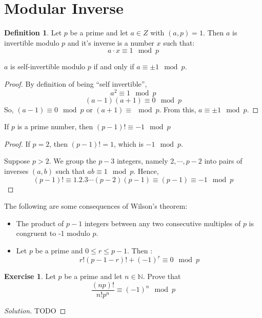 \documentclass[12pt,letterpaper]{amsbook}
\theoremstyle{definition}
\newtheorem{definition}{Definition} %
\newtheorem*{exercise}{Exercise}
\newenvironment{solution}
  {\renewcommand\qedsymbol{$\blacksquare$}\begin{proof}[Solution]}
  {\end{proof}}
\newcommand{\N}{\mathbb{N}}
\begin{document}
\section{Modular Inverse}

\begin{definition}
  Let $p$ be a prime and let $a \in Z$ with $(a,p) = 1$. Then $a$ is invertible modulo $p$ and it's inverse is a number $x$ such that:
  \[a \cdot x \equiv 1 \mod p\]
\end{definition}

\begin{lemma}
  $a$ is self-invertible modulo $p$ if and only if $a \equiv \pm 1 \mod p$.
\end{lemma}
\begin{proof}
  By definition of being ``self invertible'',
  \[a^2 \equiv 1 \mod p\]
  \[(a-1)(a+1) \equiv 0 \mod p\]
  So, $(a-1) \equiv 0 \mod p$ or $(a+1) \equiv \mod p$. From this, $a \equiv \pm 1 \mod p$.
\end{proof}

\begin{theorem}
  If $p$ is a prime number, then $(p-1)! \equiv -1 \mod p$  
\end{theorem}
\begin{proof}
  If $p = 2$, then $(p-1)! = 1$, which is $-1 \mod p$.

  Suppose $p > 2$. We group the $p-3$ integers, namely $2,\cdots,p-2$ into pairs of inverses $(a,b)$ such that $ab \equiv 1 \mod p$. Hence,
  \[(p-1)! \equiv 1.2.3 \cdots (p-2)(p-1) \equiv (p-1) \equiv -1 \mod p\]
\end{proof}

The following are some consequences of Wilson's theorem:
\begin{itemize}
  \item The product of $p-1$ integers between any two consecutive multiples of $p$ is congruent to -1 modulo $p$.
  \item Let $p$ be a prime and $0 \leq r \leq p-1$. Then :
    \[r! (p-1-r)! + (-1)^r \equiv 0 \mod p\]
\end{itemize}

\begin{exercise}
  Let $p$ be a prime and let $n \in \N$. Prove that 
  \[\frac{(np)!}{n!p^n} \equiv (-1)^n \mod p\]
\end{exercise}
\begin{solution}
TODO  
\end{solution}
\end{document}
